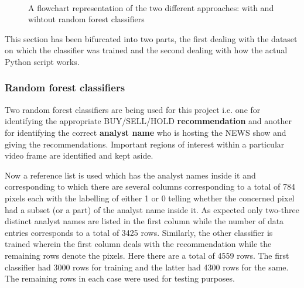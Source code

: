 \begin{figure}[h]
 \centering
  \\
 \vspace{1.5cm}
 \caption{A flowchart representation of the two different approaches: with and wihtout random forest classifiers}
 \label{fig:not_rf_and_rf}
\end{figure}

This section has been bifurcated into two parts, the first dealing with the dataset on which the classifier was trained and the second dealing with how the actual Python script works.

\subsubsection{Random forest classifiers}
Two random forest classifiers are being used for this project i.e. one for identifying the appropriate BUY/SELL/HOLD \textbf{recommendation} and another for identifying the correct \textbf{analyst name} who is hosting the NEWS show and giving the recommendations. Important regions of interest within a particular video frame are identified and kept aside. \par

Now a reference list is used which has the analyst names inside it and corresponding to which there are several columns corresponding to a total of 784 pixels each with the labelling of either 1 or 0 telling whether the concerned pixel had a subset (or a part) of the analyst name inside it. As expected only two-three distinct analyst names are listed in the first column while the number of data entries corresponds to a total of 3425 rows. Similarly, the other classifier is trained wherein the first column deals with the recommendation while the remaining rows denote the pixels. Here there are a total of 4559 rows. The first classifier had 3000 rows for training and the latter had 4300 rows for the same. The remaining rows in each case were used for testing purposes. \par

